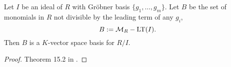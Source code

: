 \begin{theorem}
  Let $I$ be an ideal of $R$ with Gr\"obner basis $\{ g_1, \ldots, g_m \}$.
  Let $B$ be the set of monomials in $R$ not divisible by the leading term of any $g_i$,
    \[ B := \mathcal{M}_R - \operatorname{LT}(I). \]
  Then $B$ is a $K$-vector space basis for $R/I$.
\end{theorem}
\begin{proof}
  Theorem 15.2 in \cite{eisenbud95}.
\end{proof}
\begin{comment}
\begin{proof}
  \begin{description}
    \item [$B$ is linearly independent in $R/I$:]
      Suppose that $B$ is \emph{not} linearly independent.
      Then there exists a family of coefficients $\{k_b\}_{b \in B}$, not all zero, such that
        \[ \sum_{b \in B} k_b b \equiv 0 \]
      in $R/I$.
      This implies that the left hand side of this equivalence is an element of $I$,
      thus
        \[ \sum_{b \in B} k_b b = p \]
      for some $p \in I$ and
        \[ \LT\left(\sum_{b \in B} k_b b\right) = \LT(p). \]
      Now the left-hand side is simply equal to $k_{b'}b'$ for some $b' \in B$
      (and $k_{b'} \neq 0$, or else it would not be the leading term).
      The right hand side is a member of $\LT(I)$.
      This implies $b' \in \LT(I)$, contradicting the construction $B = \cal M_R - \LT(I)$.
      
    \item [$B$ spans $R/I$:]
      If $I = R$, the result is trivial, so suppose $I \neq R$. 
      Suppose $B$ does \emph{not} span $R/I$.
      Let $X = \Span_R B \cup I$.
      (Note that $X$ is closed under addition.)
      Then $X$ is a non-empty proper subset of $R$.
      Thus $R - X$ is also a non-empty proper subset of $R$.
      Among all polynomials in $R - X$, let $f$ be one with minimal leading term with respect $R$'s monomial order.
      Such an $f$ exists, since monomial orders are well-orders.
      We may assume $f$ is monic.
      We will see that for such an element to exist will nonetheless lead to contradiction.

      \begin{center}
        \begin{tikzpicture}
          \draw (-1, 0 ) circle (2)
                (-1, 2 ) node [above] {$\LT(I)$}
                ( 1, 0 ) circle (2)
                ( 1, 2 ) node [above] {$\cal M_R$}
                ( 2, 0 ) node [right] {$B$};
        \end{tikzpicture}
      \end{center}
      
      Either $\LT(f) \in B$ or $\LT(f) \in \LT(I)$.
      In the first case, suppose $\LT(f) = b \in B$.
      Then $f - b \in R - X$ has a smaller leading term than $f$,
      contradicting our choice of $f$.
      Otherwise, suppose $\LT(f) = m \in \LT(I)$.
      Then we can subtract from $f$ any monic polynomial in $I$ with the same leading term,
      again yielding a smaller polynomial in $R - X$.
  \end{description}
\end{proof}
\end{comment}

